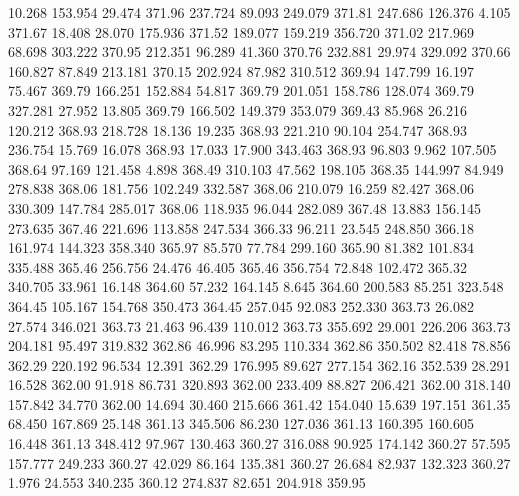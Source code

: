   10.268  153.954   29.474       371.96
 237.724   89.093  249.079       371.81
 247.686  126.376    4.105       371.67
  18.408   28.070  175.936       371.52
 189.077  159.219  356.720       371.02
 217.969   68.698  303.222       370.95
 212.351   96.289   41.360       370.76
 232.881   29.974  329.092       370.66
 160.827   87.849  213.181       370.15
 202.924   87.982  310.512       369.94
 147.799   16.197   75.467       369.79
 166.251  152.884   54.817       369.79
 201.051  158.786  128.074       369.79
 327.281   27.952   13.805       369.79
 166.502  149.379  353.079       369.43
  85.968   26.216  120.212       368.93
 218.728   18.136   19.235       368.93
 221.210   90.104  254.747       368.93
 236.754   15.769   16.078       368.93
  17.033   17.900  343.463       368.93
  96.803    9.962  107.505       368.64
  97.169  121.458    4.898       368.49
 310.103   47.562  198.105       368.35
 144.997   84.949  278.838       368.06
 181.756  102.249  332.587       368.06
 210.079   16.259   82.427       368.06
 330.309  147.784  285.017       368.06
 118.935   96.044  282.089       367.48
  13.883  156.145  273.635       367.46
 221.696  113.858  247.534       366.33
  96.211   23.545  248.850       366.18
 161.974  144.323  358.340       365.97
  85.570   77.784  299.160       365.90
  81.382  101.834  335.488       365.46
 256.756   24.476   46.405       365.46
 356.754   72.848  102.472       365.32
 340.705   33.961   16.148       364.60
  57.232  164.145    8.645       364.60
 200.583   85.251  323.548       364.45
 105.167  154.768  350.473       364.45
 257.045   92.083  252.330       363.73
  26.082   27.574  346.021       363.73
  21.463   96.439  110.012       363.73
 355.692   29.001  226.206       363.73
 204.181   95.497  319.832       362.86
  46.996   83.295  110.334       362.86
 350.502   82.418   78.856       362.29
 220.192   96.534   12.391       362.29
 176.995   89.627  277.154       362.16
 352.539   28.291   16.528       362.00
  91.918   86.731  320.893       362.00
 233.409   88.827  206.421       362.00
 318.140  157.842   34.770       362.00
  14.694   30.460  215.666       361.42
 154.040   15.639  197.151       361.35
  68.450  167.869   25.148       361.13
 345.506   86.230  127.036       361.13
 160.395  160.605   16.448       361.13
 348.412   97.967  130.463       360.27
 316.088   90.925  174.142       360.27
  57.595  157.777  249.233       360.27
  42.029   86.164  135.381       360.27
  26.684   82.937  132.323       360.27
   1.976   24.553  340.235       360.12
 274.837   82.651  204.918       359.95
